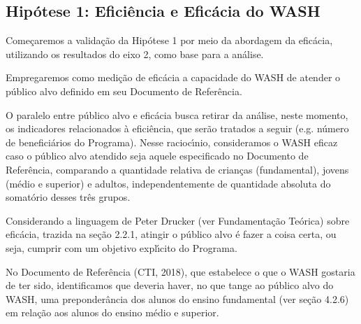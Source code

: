 \documentclass[
12pt,		%
openright,	%
twoside,  %
a4paper,			%
chapter=TITLE,		%
english,			%
french,				%
spanish,			%
brazil				%
]{USPSC-classe/USPSC}
\begin{document}
\subsection[Hip\'otese 1: Efici\^encia e Efic\'acia do WASH]{Hip\'otese 1: Efici\^encia e Efic\'acia do WASH}\label{Hip\'otese 1: Efici\^encia e Efic\'acia do WASH}
Come\c{c}aremos a valida\c{c}\~ao da Hip\'otese 1 por meio da abordagem da efic\'acia, utilizando os resultados do eixo 2, como base para a an\'alise.









Empregaremos como medi\c{c}\~ao de efic\'acia a capacidade do WASH de atender o p\'ublico alvo definido em seu Documento de Refer\^encia.









O paralelo entre \textquotedbl  p\'ublico alvo \textquotedbl  e efic\'acia busca retirar da an\'alise, neste momento, os indicadores relacionados \`a efici\^encia, que ser\~ao tratados a seguir (e.g. n\'umero de benefici\'arios do Programa). Nesse racioc\'{\i}nio, consideramos o WASH eficaz caso o p\'ublico alvo atendido seja aquele especificado no Documento de Refer\^encia, comparando a quantidade relativa de crian\c{c}as (fundamental), jovens (m\'edio e superior) e adultos, independentemente de quantidade absoluta do somat\'orio desses tr\^es grupos.









Considerando a linguagem de Peter Drucker (ver Fundamenta\c{c}\~ao Te\'orica) sobre efic\'acia, trazida na se\c{c}\~ao 2.2.1, atingir o p\'ublico alvo \'e \textquotedbl fazer a coisa certa\textquotedbl , ou seja, cumprir com um objetivo expl\'{\i}cito do Programa.









No Documento de Refer\^encia (CTI, 2018), que estabelece \textquotedbl o que o WASH gostaria de ter sido\textquotedbl , identificamos que deveria haver, no que tange ao p\'ublico alvo do WASH, uma preponder\^ancia dos alunos do ensino fundamental (ver se\c{c}\~ao 4.2.6) em rela\c{c}\~ao aos alunos do ensino m\'edio e superior.
\end{document}
